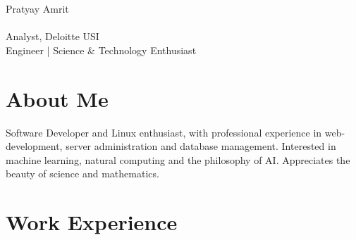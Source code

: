\documentclass[10pt]{article} %
\begin{document}
\begin{paracol}{2} %


\parbox[top][0.12\textheight][c]{\linewidth}{ %
	\vspace{-0.04\textheight} %
	{\cvtextfont\Huge Pratyay Amrit}\\\medskip %
    \\\medskip
	{\LARGE\color{headings} Analyst, Deloitte USI}\\\medskip
    {\Large\color{headings} Engineer | Science \& Technology Enthusiast}
}


\section{About Me}

Software Developer and Linux enthusiast, with professional experience in web-development, server administration and database management. Interested in machine learning, natural computing and the philosophy of AI. Appreciates the beauty of science and mathematics.

\medskip %


\section{Work Experience}




\end{paracol}
\end{document}

